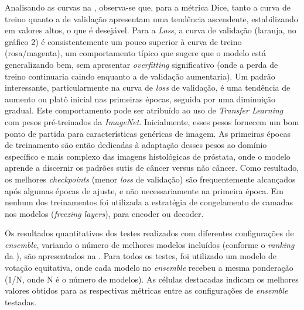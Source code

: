Analisando as curvas na , observa-se que, para a métrica Dice, tanto a curva de treino quanto a de validação apresentam uma tendência ascendente, estabilizando em valores altos, o que é desejável. Para a \textit{Loss}, a curva de validação (laranja, no gráfico 2) é consistentemente um pouco superior à curva de treino (rosa/magenta), um comportamento típico que sugere que o modelo está generalizando bem, sem apresentar \textit{overfitting} significativo (onde a perda de treino continuaria caindo enquanto a de validação aumentaria). 
Um padrão interessante, particularmente na curva de \textit{loss} de validação, é uma tendência de aumento ou platô inicial nas primeiras épocas, seguida por uma diminuição gradual. Este comportamento pode ser atribuído ao uso de \textit{Transfer Learning} com pesos pré-treinados da \textit{ImageNet}. Inicialmente, esses pesos fornecem um bom ponto de partida para características genéricas de imagem. As primeiras épocas de treinamento são então dedicadas à adaptação desses pesos ao domínio específico e mais complexo das imagens histológicas de próstata, onde o modelo aprende a discernir os padrões sutis de câncer versus não câncer. Como resultado, os melhores \textit{checkpoints} (menor \textit{loss} de validação) são frequentemente alcançados após algumas épocas de ajuste, e não necessariamente na primeira época. Em nenhum dos treinamentos foi utilizada a estratégia de congelamento de camadas nos modelos (\textit{freezing layers}), para encoder ou decoder.

Os resultados quantitativos dos testes realizados com diferentes configurações de \textit{ensemble}, variando o número de melhores modelos incluídos (conforme o \textit{ranking} da ), são apresentados na . Para todos os testes, foi utilizado um modelo de votação equitativa, onde cada modelo no \textit{ensemble} recebeu a mesma ponderação (1/N, onde N é o número de modelos). As células destacadas indicam os melhores valores obtidos para as respectivas métricas entre as configurações de \textit{ensemble} testadas.

